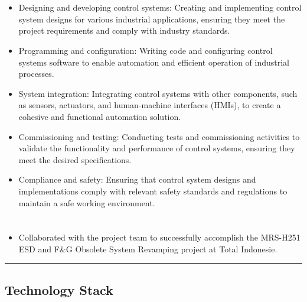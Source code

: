 \documentclass[12pt]{res}
\begin{document}
\begin{resume}
\begin{multicols}{2}
	\section{}
		\begin{itemize}
			\item Designing and developing control systems: Creating and implementing control system designs for various industrial applications, ensuring they meet the project requirements and comply with industry standards.
\item Programming and configuration: Writing code and configuring control systems software to enable automation and efficient operation of industrial processes.
\item System integration: Integrating control systems with other components, such as sensors, actuators, and human-machine interfaces (HMIs), to create a cohesive and functional automation solution.
\item Commissioning and testing: Conducting tests and commissioning activities to validate the functionality and performance of control systems, ensuring they meet the desired specifications.
\item Compliance and safety: Ensuring that control system designs and implementations comply with relevant safety standards and regulations to maintain a safe working environment.
		\end{itemize}
	\section{}
		\begin{itemize}
			\setlength{\itemindent}{0pt}
			\item Collaborated with the project team to successfully accomplish the MRS-H251 ESD and F\&G Obsolete System Revamping project at Total Indonesie.
		\end{itemize}
\end{multicols}

\vspace{-20pt}
\begin{minipage}[t]{0.55\linewidth}
	\rule{0.25\textwidth}{2pt}
	\begin{multicols}{2}
		\section{Technology Stack}
		\columnbreak

\end{multicols}
\end{minipage}
\end{resume}
\end{document}
